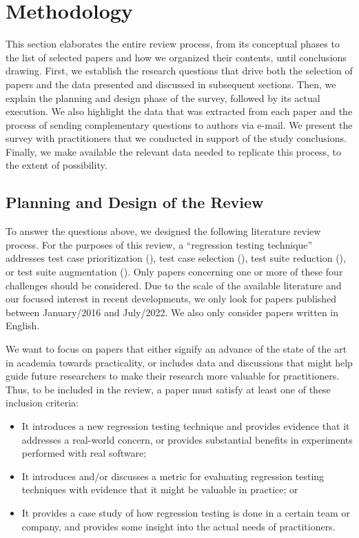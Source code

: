 \section{Methodology}\label{sec:lit_methodology}

This section elaborates the entire review process, from its conceptual phases to the list of selected papers and how we organized their contents, until conclusions drawing.
First, we establish the research questions that drive both the selection of papers and the data presented and discussed in subsequent sections.
Then, we explain the planning and design phase of the survey, followed by its actual execution.
We also highlight the data that was extracted from each paper and the process of sending complementary questions to authors via e-mail. We present the survey with practitioners that we conducted in support of the study conclusions.
Finally, we make available the relevant data needed to replicate this process, to the extent of possibility.

\subsection{Planning and Design of the Review}

To answer the questions above, we designed the following literature review process.
For the purposes of this review, a ``regression testing technique'' addresses test case prioritization (\tcp), test case selection (\tcs), test suite reduction (\tsr), or test suite augmentation (\tsa).
Only papers concerning one or more of these four challenges should be considered.
Due to the scale of the available literature and our focused interest in recent developments, we only look for papers published between January/2016 and July/2022.
We also only consider papers written in English.

We want to focus on papers that either signify an advance of the state of the art in academia towards practicality, or includes data and discussions that might help guide future researchers to make their research more valuable for practitioners.
Thus, to be included in the review, a paper must satisfy at least one of these inclusion criteria:
\begin{itemize}
    \item It introduces a new regression testing technique and provides evidence that it addresses a real-world concern, or provides substantial benefits in experiments performed with real software;
    \item It introduces and/or discusses a metric for evaluating regression testing techniques with evidence that it might be valuable in practice; or
    \item It provides a case study of how regression testing is done in a certain team or company, and provides some insight into the actual needs of practitioners.
\end{itemize}

